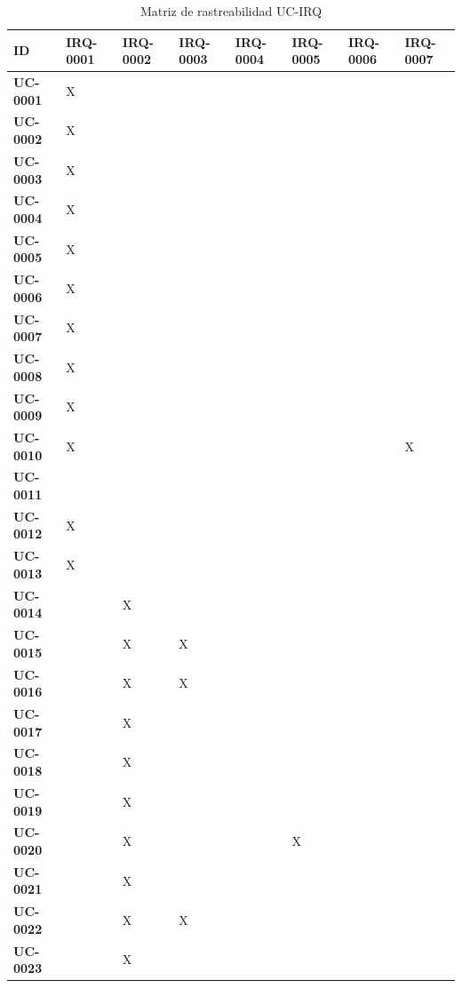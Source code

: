 \documentclass[11pt, a4paper]{article}
\begin{document}
{\setlength{\tabcolsep}{3pt}
\begin{center}
{\footnotesize
\begin{longtable}{|p{1.6cm}|p{1.55cm}|p{1.55cm}|p{1.55cm}|p{1.55cm}|p{1.55cm}|p{1.55cm}|p{1.55cm}|}
\caption{Matriz de rastreabilidad UC-IRQ} \label{tab:matriz-uc-irq} \\
\hline
\textbf{ID} & \textbf{IRQ-0001} & \textbf{IRQ-0002} & \textbf{IRQ-0003} & \textbf{IRQ-0004} & \textbf{IRQ-0005} & \textbf{IRQ-0006} & \textbf{IRQ-0007} \\
\hline
\hline
\endhead
\textbf{UC-0001} & X &  &  &  &  &  &  \\
\hline
\textbf{UC-0002} & X &  &  &  &  &  &  \\
\hline
\textbf{UC-0003} & X &  &  &  &  &  &  \\
\hline
\textbf{UC-0004} & X &  &  &  &  &  &  \\
\hline
\textbf{UC-0005} & X &  &  &  &  &  &  \\
\hline
\textbf{UC-0006} & X &  &  &  &  &  &  \\
\hline
\textbf{UC-0007} & X &  &  &  &  &  &  \\
\hline
\textbf{UC-0008} & X &  &  &  &  &  &  \\
\hline
\textbf{UC-0009} & X &  &  &  &  &  &  \\
\hline
\textbf{UC-0010} & X &  &  &  &  &  & X \\
\hline
\textbf{UC-0011} &  &  &  &  &  &  &  \\
\hline
\textbf{UC-0012} & X &  &  &  &  &  &  \\
\hline
\textbf{UC-0013} & X &  &  &  &  &  &  \\
\hline
\textbf{UC-0014} &  & X &  &  &  &  &  \\
\hline
\textbf{UC-0015} &  & X & X &  &  &  &  \\
\hline
\textbf{UC-0016} &  & X & X &  &  &  &  \\
\hline
\textbf{UC-0017} &  & X &  &  &  &  &  \\
\hline
\textbf{UC-0018} &  & X &  &  &  &  &  \\
\hline
\textbf{UC-0019} &  & X &  &  &  &  &  \\
\hline
\textbf{UC-0020} &  & X &  &  & X &  &  \\
\hline
\textbf{UC-0021} &  & X &  &  &  &  &  \\
\hline
\textbf{UC-0022} &  & X & X &  &  &  &  \\
\hline
\textbf{UC-0023} &  & X &  &  &  &  &  \\

\end{longtable}}
\end{center}}
\end{document}
